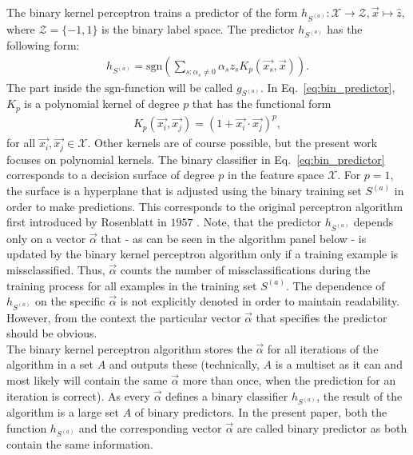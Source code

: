 The binary kernel perceptron trains a predictor of the form $h_{S^{(a)}}: \mathcal{X} \rightarrow \mathcal{Z}, \vec{x} \mapsto \hat{z}$, where $\mathcal{Z} = \{-1, 1\}$ is the binary label space. The predictor $h_{S^{(a)}}$ has the following form:
\begin{align}\label{eq:bin_predictor}
	h_{S^{(a)}} = \mathrm{sgn}\left( \sum_{s: \alpha_s \neq 0} \alpha_s z_s 	     	K_p(\vec{x_s}, \vec{x}) \right).
\end{align}
The part inside the $\mathrm{sgn}$-function will be called $g_{S^{(a)}}$. In Eq.~\ref{eq:bin_predictor}, $K_p$ is a polynomial kernel of degree $p$ that has the functional form
\begin{align*}
	K_p(\vec{x_i}, \vec{x_j}) = (1 + \vec{x_i} \cdot \vec{x_j})^p,
\end{align*}
for all $\vec{x_i}, \vec{x_j} \in \mathcal{X}$. Other kernels are of course possible, but the present work focuses on polynomial kernels. The binary classifier in Eq.~\ref{eq:bin_predictor} corresponds to a decision surface of degree $p$ in the feature space $\mathcal{X}$. For $p=1$, the surface is a hyperplane that is adjusted using the binary training set $S^{(a)}$ in order to make predictions. This corresponds to the original perceptron algorithm first introduced by Rosenblatt in $1957$ \cite{perceptron1957}. Note, that the predictor $h_{S^{(a)}}$ depends only on a vector $\vec{\alpha}$ that - as can be seen in the algorithm panel below - is updated by the binary kernel perceptron algorithm only if a training example is missclassified. Thus, $\vec{\alpha}$ counts the number of missclassifications during the training process for all examples in the training set $S^{(a)}$. The dependence of $h_{S^{(a)}}$ on the specific $\vec{\alpha}$ is not explicitly denoted in order to maintain readability. However, from the context the particular vector $\vec{\alpha}$ that specifies the predictor should be obvious.\\ 

The binary kernel perceptron algorithm stores the $\vec{\alpha}$ for all iterations of the algorithm in a set $A$ and outputs these (technically, $A$ is a multiset as it can and most likely will contain the same $\vec{\alpha}$ more than once, when the prediction for an iteration is correct). As every $\vec{\alpha}$ defines a binary classifier $h_{S^{(a)}}$, the result of the algorithm is a large set $A$ of binary predictors. In the present paper, both the function $h_{S^{(a)}}$ and the corresponding vector $\vec{\alpha}$ are called binary predictor as both contain the same information.\\

